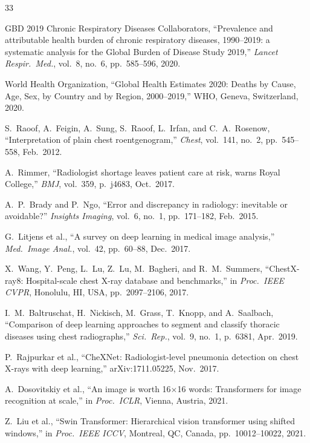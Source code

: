 \documentclass[conference]{IEEEtran}
\begin{document}
\begin{thebibliography}{33}

GBD 2019 Chronic Respiratory Diseases Collaborators,
``Prevalence and attributable health burden of chronic respiratory
diseases, 1990--2019: a systematic analysis for the Global Burden of
Disease Study 2019,''
\textit{Lancet Respir.\ Med.}, vol.~8, no.~6, pp.~585--596, 2020.

World Health Organization, ``Global Health Estimates 2020: Deaths by
Cause, Age, Sex, by Country and by Region, 2000--2019,''
WHO, Geneva, Switzerland, 2020.

S.~Raoof, A.~Feigin, A.~Sung, S.~Raoof, L.~Irfan, and
C.~A.~Rosenow, ``Interpretation of plain chest roentgenogram,''
\textit{Chest}, vol.~141, no.~2, pp.~545--558, Feb.~2012.

A.~Rimmer, ``Radiologist shortage leaves patient care at risk, warns
Royal College,'' \textit{BMJ}, vol.~359, p.~j4683, Oct.~2017.

A.~P.~Brady and P.~Ngo, ``Error and discrepancy in radiology:
inevitable or avoidable?'' \textit{Insights Imaging}, vol.~6, no.~1,
pp.~171--182, Feb.~2015.

G.~Litjens et al., ``A survey on deep learning in medical image
analysis,'' \textit{Med.\ Image Anal.}, vol.~42, pp.~60--88,
Dec.~2017.

X.~Wang, Y.~Peng, L.~Lu, Z.~Lu, M.~Bagheri, and R.~M.~Summers,
``ChestX-ray8: Hospital-scale chest X-ray database and benchmarks,''
in \textit{Proc.\ IEEE CVPR}, Honolulu, HI, USA,
pp.~2097--2106, 2017.

I.~M.~Baltruschat, H.~Nickisch, M.~Grass, T.~Knopp, and A.~Saalbach,
``Comparison of deep learning approaches to segment and classify
thoracic diseases using chest radiographs,''
\textit{Sci.\ Rep.}, vol.~9, no.~1, p.~6381, Apr.~2019.

P.~Rajpurkar et al., ``CheXNet: Radiologist-level pneumonia detection
on chest X-rays with deep learning,'' arXiv:1711.05225, Nov.~2017.

A.~Dosovitskiy et al., ``An image is worth 16$\times$16 words:
Transformers for image recognition at scale,''
in \textit{Proc.\ ICLR}, Vienna, Austria, 2021.

Z.~Liu et al., ``Swin Transformer: Hierarchical vision transformer
using shifted windows,''
in \textit{Proc.\ IEEE ICCV}, Montreal, QC, Canada,
pp.~10012--10022, 2021.


\end{thebibliography}
\end{document}
